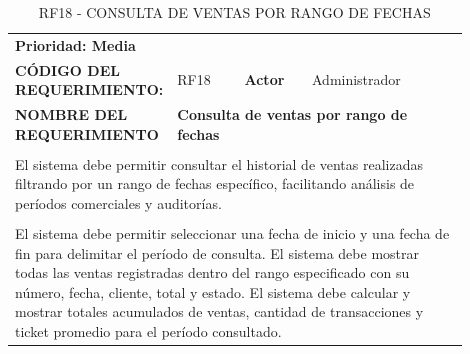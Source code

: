 \begingroup
\renewcommand{\arraystretch}{1.3}
\setlength{\tabcolsep}{6pt}
\centering
\begin{longtable}{|p{0.25\linewidth}|p{0.15\linewidth}|p{0.15\linewidth}|p{0.35\linewidth}|}
\caption{RF18 - CONSULTA DE VENTAS POR RANGO DE FECHAS}\label{tab:rf18}\\
\hline
		\rowcolor{tableheaderblue}
		\multicolumn{4}{|l|}{\textbf{Requerimientos funcionales}}                                                                                                                                      \\ \hline
		\multicolumn{4}{|l|}{\textbf{Prioridad: Media}}                                                                                                                                                \\ \hline
		\textbf{CÓDIGO DEL REQUERIMIENTO:}                          & RF18                                                                 & \cellcolor{tableheaderblue}\textbf{Actor} & Administrador \\ \hline
		\textbf{NOMBRE DEL REQUERIMIENTO}                           & \multicolumn{3}{l|}{\textbf{Consulta de ventas por rango de fechas}}                                                             \\ \hline
		\rowcolor{tableheaderblue}
		\multicolumn{4}{|l|}{\textbf{Descripción}}                                                                                                                                                     \\ \hline
		\multicolumn{4}{|p{0.96\linewidth}|}{%
		El sistema debe permitir consultar el historial de ventas realizadas filtrando por un rango de fechas específico, facilitando análisis de períodos comerciales y auditorías.}                  \\ \hline
		\rowcolor{tableheaderblue}
		\multicolumn{4}{|l|}{\textbf{Funcionalidad}}                                                                                                                                                   \\ \hline
		\multicolumn{4}{|p{0.96\linewidth}|}{%
		El sistema debe permitir seleccionar una fecha de inicio y una fecha de fin para delimitar el período de consulta. \newline
		El sistema debe mostrar todas las ventas registradas dentro del rango especificado con su número, fecha, cliente, total y estado. \newline
		El sistema debe calcular y mostrar totales acumulados de ventas, cantidad de transacciones y ticket promedio para el período consultado. \newline
}
\end{longtable}
